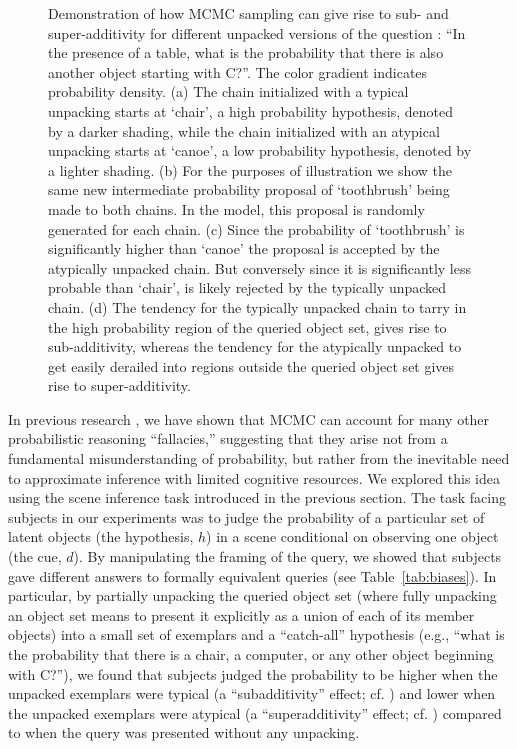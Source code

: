 \begin{figure}
\begin{center}
\caption{Demonstration of how MCMC sampling can give rise to sub- and super-additivity for different unpacked versions of the question : ``In the presence of a table, what is the probability that there is also another object starting with C?''. The color gradient indicates probability density. (a) The chain initialized with a typical unpacking starts at `chair', a high probability hypothesis, denoted by a darker shading, while the chain initialized with an atypical unpacking starts at `canoe', a low probability hypothesis, denoted by a lighter shading. 
(b) For the purposes of illustration we show the same new intermediate probability proposal of `toothbrush' being made to both chains. In the model, this proposal is randomly generated for each chain. %
(c) Since the probability of `toothbrush' is significantly higher than `canoe' the proposal is accepted by the atypically unpacked chain. But conversely since it is significantly less probable than `chair', is likely rejected by the typically unpacked chain.
(d) The tendency for the typically unpacked chain to tarry in the high probability region of the queried object set, gives rise to sub-additivity, whereas the tendency for the atypically unpacked to get easily derailed into regions outside the queried object set gives rise to super-additivity.}
\label{fig:demo}
\end{center}
\end{figure}

In previous research \citep{dasgupta17}, we have shown that MCMC can account for many other probabilistic reasoning ``fallacies,'' suggesting that they arise not from a fundamental misunderstanding of probability, but rather from the inevitable need to approximate inference with limited cognitive resources. We explored this idea using the scene inference task introduced in the previous section. The task facing subjects in our experiments was to judge the probability of a particular set of latent objects (the hypothesis, $h$) in a scene conditional on observing one object (the cue, $d$). By manipulating the framing of the query, we showed that subjects gave different answers to formally equivalent queries (see Table~\ref{tab:biases}). In particular, by partially unpacking the queried object set (where fully unpacking an object set means to present it explicitly as a union of each of its member objects) into a small set of exemplars and a ``catch-all'' hypothesis (e.g., ``what is the probability that there is a chair, a computer, or any other object beginning with C?''), we found that subjects judged the probability to be higher when the unpacked exemplars were typical (a ``subadditivity'' effect; cf. \citet{tversky94}) and lower when the unpacked exemplars were atypical (a ``superadditivity'' effect; cf. \citet{sloman04}) compared to when the query was presented without any unpacking.

